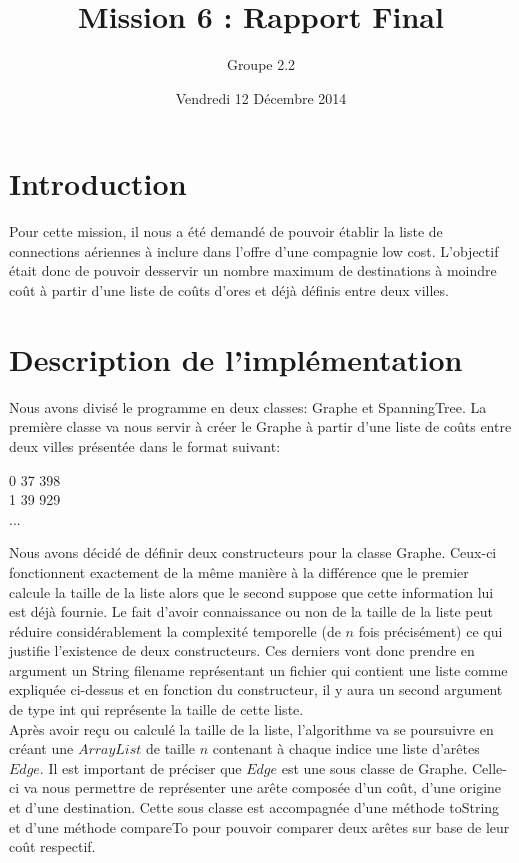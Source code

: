 \documentclass[10pt,a4paper]{article}
\date{Vendredi 12 Décembre 2014}
\author{Groupe 2.2}
\title{Mission 6 : Rapport Final}
\begin{document}
\maketitle
\section*{Introduction}
Pour cette mission, il nous a été demandé de pouvoir établir la liste de connections aériennes à inclure dans l'offre d'une compagnie low cost. L'objectif était donc de pouvoir desservir un nombre maximum de destinations à moindre coût à partir d'une liste de coûts d'ores et déjà définis entre deux villes.

\section*{Description de l'implémentation}
Nous avons divisé le programme en deux classes: Graphe et SpanningTree. La première classe va nous servir à créer le Graphe à partir d'une liste de coûts entre deux villes présentée dans le format suivant:\\

\begin{center}
0 \hspace{1cm} 37 \hspace{1cm} 398\\
1 \hspace{1cm} 39 \hspace{1cm} 929\\
...
\end{center}

Nous avons décidé de définir deux constructeurs pour la classe Graphe. Ceux-ci fonctionnent exactement de la même manière à la différence que le premier calcule la taille de la liste alors que le second suppose que cette information lui est déjà fournie. Le fait d'avoir connaissance ou non de la taille de la liste peut réduire considérablement la complexité temporelle (de $n$ fois précisément) ce qui justifie l'existence de deux constructeurs. Ces derniers vont donc prendre en argument un String filename représentant un fichier qui contient une liste comme expliquée ci-dessus et en fonction du constructeur, il y aura un second argument de type int qui représente la taille de cette liste.\\

Après avoir reçu ou calculé la taille de la liste, l'algorithme va se poursuivre en créant une $ArrayList$ de taille $n$ contenant à chaque indice une liste d'arêtes $Edge$. Il est important de préciser que $Edge$ est une sous classe de Graphe. Celle-ci va nous permettre de représenter une arête composée d'un coût, d'une origine et d'une destination. Cette sous classe est accompagnée d'une méthode toString et d'une méthode compareTo pour pouvoir comparer deux arêtes sur base de leur coût respectif.\\
\end{document}

